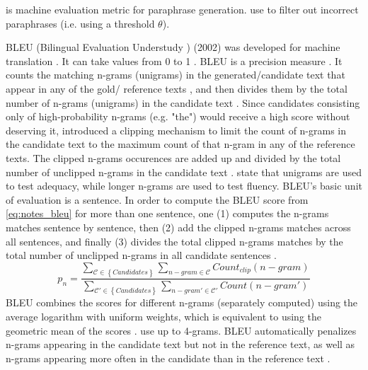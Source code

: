 \bluert{} is machine evaluation metric for paraphrase generation.
\citet{fu_learning_2024} use \bluert{} to filter out incorrect paraphrases (i.e. using a threshold $\theta$).

BLEU (Bilingual Evaluation Understudy \cite{palivela_optimization_2021,zhou_paraphrase_2025,papineni_bleu_2001}) (2002) 
was developed for machine translation \cite{zhou_paraphrase_2021,papineni_bleu_2001}.
It can take values from 0 to 1 \cite{papineni_bleu_2001}.
BLEU is a precision measure \cite{kurt_pehlivanoglu_comparative_2024,papineni_bleu_2001}.
It counts the matching n-grams (unigrams) in the generated/candidate text that appear in any of the gold/ reference texts \cite{palivela_optimization_2021,papineni_bleu_2001}, 
and then divides them by the total number of n-grams (unigrams) in the candidate text \cite{papineni_bleu_2001}.
Since candidates consisting only of high-probability n-grams (e.g. "the") would receive a high score without deserving it, 
\citet{papineni_bleu_2001} introduced a clipping mechanism to limit the count of n-grams in the candidate text to the maximum count of that n-gram in any of the reference texts.
The clipped n-grams occurences are added up and divided by the total number of unclipped n-grams in the candidate text \cite{papineni_bleu_2001}.
\citet{papineni_bleu_2001} state that unigrams are used to test adequacy, while longer n-grams are used to test fluency.
BLEU's basic unit of evaluation is a sentence. 
In order to compute the BLEU score from \autoref{eq:notes_bleu} for more than one sentence, one (1) computes the n-grams matches sentence by sentence, 
then (2) add the clipped n-grams matches across all sentences, 
and finally (3) divides the total clipped n-grams matches by the total number of unclipped n-grams in all candidate sentences \cite{papineni_bleu_2001}.
\begin{equation}
    p_n = \frac{\sum_{\mathcal{C} \in \left\{ Candidates \right\}}\sum_{n-gram \in\mathcal{C}}Count_{clip}(n-gram)}{\sum_{\mathcal{C'} \in \left\{ Candidates \right\}}\sum_{n-gram' \in\mathcal{C'}}Count(n-gram')}
\label{eq:notes_bleu}
\end{equation}
BLEU combines the scores for different n-grams (separately computed) using the average logarithm with uniform weights, 
which is equivalent to using the geometric mean of the scores \cite{papineni_bleu_2001,banerjee_METEOR_2005}.
\citet{gohsen_captions_2023} use up to 4-grams.
BLEU automatically penalizes n-grams appearing in the candidate text but not in the reference text, as well as n-grams appearing more often in the candidate than in the reference text \cite{papineni_bleu_2001}.
